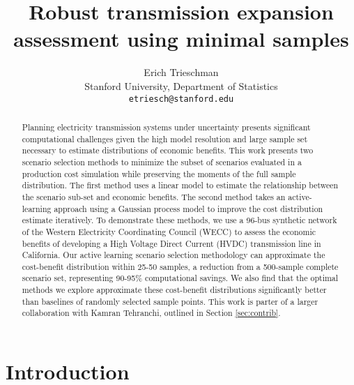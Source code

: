\documentclass[10pt,twocolumn,letterpaper]{article}
\begin{document}
\title{Robust transmission expansion assessment using minimal samples}

\author{Erich Trieschman\\
Stanford University, Department of Statistics\\
{\tt\small etriesch@stanford.edu}
}
\maketitle

\begin{abstract}
    Planning electricity transmission systems under uncertainty presents significant computational challenges given the high model resolution and large sample set necessary to estimate distributions of economic benefits. This work presents two scenario selection methods to minimize the subset of scenarios evaluated in a production cost simulation while preserving the moments of the full sample distribution. The first method uses a linear model to estimate the relationship between the scenario sub-set and economic benefits. The second method takes an active-learning approach using a Gaussian process model to improve the cost distribution estimate iteratively.  To demonstrate these methods, we use a 96-bus synthetic network of the Western Electricity Coordinating Council (WECC) to assess the economic benefits of developing a High Voltage Direct Current (HVDC) transmission line in California. Our active learning scenario selection methodology can approximate the cost-benefit distribution within 25-50 samples, a reduction from a 500-sample complete scenario set, representing 90-95\% computational savings. We also find that the optimal methods we explore approximate these cost-benefit distributions significantly better than baselines of randomly selected sample points. This work is parter of a larger collaboration with Kamran Tehranchi, outlined in Section \ref{sec:contrib}.
\end{abstract}
  

\section{Introduction}
\label{sec:intro}
\end{document}
